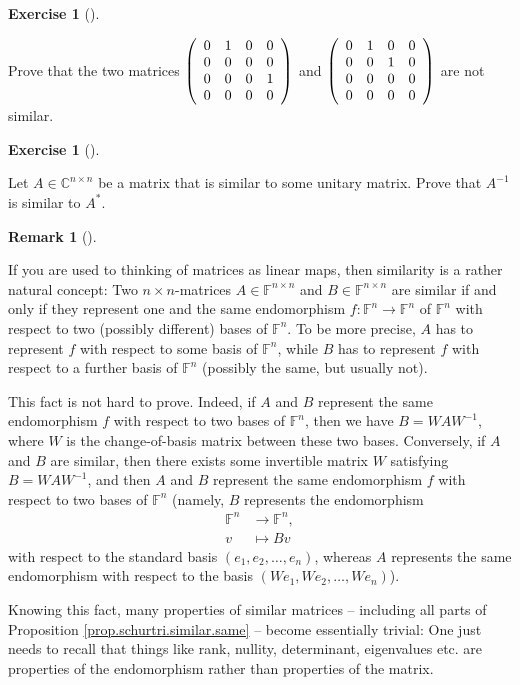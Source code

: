 \documentclass[numbers=enddot,12pt,final,onecolumn,notitlepage]{scrartcl}%
\newcounter{exer}
\numberwithin{exer}{subsection}
\theoremstyle{definition}
\newtheorem{remk}[theo]{Remark}
\newenvironment{remark}[1][]
{\begin{remk}[#1]\begin{leftbar}}
{\end{leftbar}\end{remk}}
\newtheorem{exmp}[exer]{Exercise}
\newenvironment{exercise}[1][]
{\begin{exmp}[#1]\begin{leftbar}}
{\end{leftbar}\end{exmp}}
\begin{document}
\begin{exercise}
\label{exe.schurtri.similar.two-4x4s} Prove that the two matrices
$\left(
\begin{array}
[c]{cccc}%
0 & 1 & 0 & 0\\
0 & 0 & 0 & 0\\
0 & 0 & 0 & 1\\
0 & 0 & 0 & 0
\end{array}
\right)  $ and $\left(
\begin{array}
[c]{cccc}%
0 & 1 & 0 & 0\\
0 & 0 & 1 & 0\\
0 & 0 & 0 & 0\\
0 & 0 & 0 & 0
\end{array}
\right)  $ are not similar.
\end{exercise}

\begin{exercise}
\label{exe.schurtri.similar.unitary-inv} Let $A\in\mathbb{C}^{n\times
n}$ be a matrix that is similar to some unitary matrix. Prove that $A^{-1}$ is
similar to $A^{\ast}$.
\end{exercise}

\begin{remark}
If you are used to thinking of matrices as linear maps, then similarity is a
rather natural concept: Two $n\times n$-matrices $A\in\mathbb{F}^{n\times n}$
and $B\in\mathbb{F}^{n\times n}$ are similar if and only if they represent one
and the same endomorphism $f:\mathbb{F}^{n}\rightarrow\mathbb{F}^{n}$ of
$\mathbb{F}^{n}$ with respect to two (possibly different) bases of
$\mathbb{F}^{n}$. To be more precise, $A$ has to represent $f$ with respect to
some basis of $\mathbb{F}^{n}$, while $B$ has to represent $f$ with respect to
a further basis of $\mathbb{F}^{n}$ (possibly the same, but usually not).

This fact is not hard to prove. Indeed, if $A$ and $B$ represent the same
endomorphism $f$ with respect to two bases of $\mathbb{F}^{n}$, then we have
$B=WAW^{-1}$, where $W$ is the change-of-basis matrix between these two bases.
Conversely, if $A$ and $B$ are similar, then there exists some invertible
matrix $W$ satisfying $B=WAW^{-1}$, and then $A$ and $B$ represent the same
endomorphism $f$ with respect to two bases of $\mathbb{F}^{n}$ (namely, $B$
represents the endomorphism%
\begin{align*}
\mathbb{F}^{n}  &  \rightarrow\mathbb{F}^{n},\\
v  &  \mapsto Bv
\end{align*}
with respect to the standard basis $\left(  e_{1},e_{2},\ldots,e_{n}\right)
$, whereas $A$ represents the same endomorphism with respect to the basis
$\left(  We_{1},We_{2},\ldots,We_{n}\right)  $).

Knowing this fact, many properties of similar matrices -- including all parts
of Proposition \ref{prop.schurtri.similar.same} -- become essentially trivial:
One just needs to recall that things like rank, nullity, determinant,
eigenvalues etc. are properties of the endomorphism rather than properties of
the matrix.
\end{remark}
\end{document}

